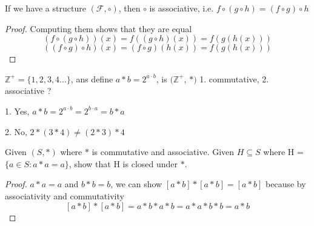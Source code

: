 \begin{definition}
    If we have a structure $(\mathcal{F}, \circ)$, then $\circ$ is associative, i.e. $f\circ(g\circ h) = (f\circ g)\circ h$
\end{definition}
\begin{proof}
    Computing them shows that they are equal
  \[(f\circ(g\circ h))(x) = f((g\circ h)(x)) = f(g(h(x)))\]
  \[((f\circ g)\circ h)(x) = (f\circ g)(h(x)) = f(g(h(x)))\]
\end{proof}

\begin{exercise}
    $\mathbb{Z}^+ = \{1, 2, 3, 4...\}$, ans define $a*b = 2^{a\cdot b}$, is $(\mathbb{Z}^+$, $*)$ 1. commutative, 2. associative ?
\end{exercise}
\begin{answer}\vphantom{}
    \item  1. Yes, $a*b = 2^{a\cdot b} = 2^{b\cdot a} = b*a$
    \item 2. No, $2*(3*4) \neq (2*3)*4$ 
\end{answer}

\begin{exercise}
    Given $(S, *)$ where $*$ is commutative and associative. Given $H \subseteq S$ where H = $\{a \in S : a*a=a\}$, show that H is closed under $*$.
\end{exercise}
\begin{proof}[Proof]
    $a*a=a$ and $b*b=b$, we can show $[a*b] * [a*b] = [a*b]$ because by associativity and commutativity
    \[[a*b] * [a*b] = a*b * a*b = a*a * b*b = a*b\]
\end{proof}




